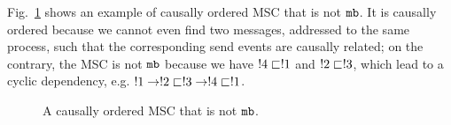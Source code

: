 Fig.~\ref{fig:co_not_none} shows an example of causally ordered MSC that is not $\mathtt{mb}$. It is causally ordered because we cannot even find two messages, addressed to the same process, such that the corresponding send events are causally related; on the contrary, the MSC is not $\mathtt{mb}$ because we have $!4 \sqsubset !1$ and $!2 \sqsubset !3$, which lead to a cyclic dependency, e.g. $!1 \to !2 \sqsubset !3 \to !4 \sqsubset !1$.

\begin{figure}[h]
	\begin{center}
		\caption{A causally ordered MSC that is not $\mathtt{mb}$.}
		\label{fig:co_not_none}
	\end{center}
\end{figure}


